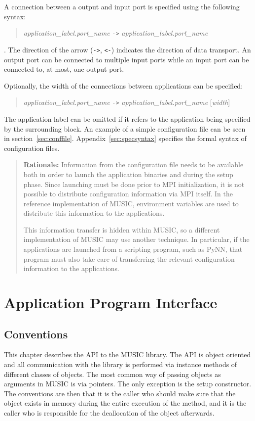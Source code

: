 \documentclass[a4paper]{report}
\newenvironment{rationale}%
{\par\begin{quote}\textbf{Rationale:}}%
{\par\end{quote}}
\begin{document}
A connection between a output and input port is specified using the
following syntax:
\begin{quote}
  \emph{application\_label.port\_name} \lstinline|->| \emph{application\_label.port\_name}
\end{quote}
\noindent.  The direction of the arrow (\lstinline|->|, \lstinline|<-|) indicates the
direction of data transport.  An output port can be connected to
multiple input ports while an input port can be connected to, at most,
one output port.

Optionally, the width of the connections between applications can be
specified:
\begin{quote}
  \emph{application\_label.port\_name} \lstinline|->|
  \emph{application\_label.port\_name} [\emph{width}]
\end{quote}
The application label can be omitted if it refers to the application
being specified by the surrounding block.
An example of a simple configuration file can be seen in
section~\ref{sec:conffile}.  Appendix~\ref{sec:specsyntax} specifies
the formal syntax of configuration files.

\begin{rationale}
  Information from the configuration file needs to be available both
  in order to launch the application binaries and during the setup
  phase.  Since launching must be done prior to MPI initialization, it
  is not possible to distribute configuration information via MPI
  itself.  In the reference implementation of MUSIC, environment
  variables are used to distribute this information to the
  applications.

  This information transfer is hidden within MUSIC, so a different
  implementation of MUSIC may use another technique.  In particular,
  if the applications are launched from a scripting program, such as
  PyNN, that program must also take care of transferring
  the relevant configuration information to the applications.
\end{rationale}


\chapter{Application Program Interface}

\section{Conventions}

This chapter describes the API to the MUSIC library.  The API is
object oriented and all communication with the library is performed
via instance methods of different classes of objects.  The most common
way of passing objects as arguments in MUSIC is via pointers.  The
only exception is the setup constructor.  The conventions are then
that it is the caller who should make sure that the object exists in
memory during the entire execution of the method, and it is the caller
who is responsible for the deallocation of the object afterwards.
\end{document}
